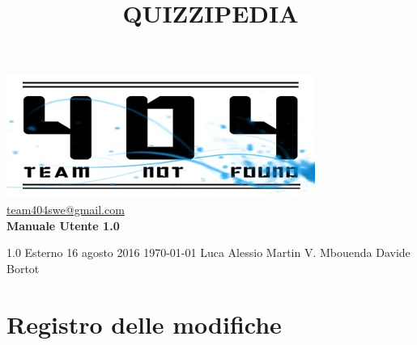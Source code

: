 \documentclass[a4paper,11pt]{article}
\title{\textbf{{\fontsize{8mm}{5mm}\selectfont QUIZZIPEDIA}}}
\date{}
\author{}
\begin{document}
	\maketitle
	\thispagestyle{empty}
	\begin{center}	
	\includegraphics{../team_not_found.jpg}\\
	\fontsize{5mm}{3mm}\url{team404swe@gmail.com}\\
	
	\vspace{50mm}
	\textbf{Manuale Utente 1.0}
	\end{center}
			{1.0} 							%
			{Esterno} 						%
			{16 agosto 2016} 				%
			{\today} 						%
			{Luca Alessio}		%
			{Martin V. Mbouenda} 			%
			{Davide Bortot} 				%
	\newpage
	\thispagestyle{empty}
	\null  

	\newpage
	\newpage
	\fancyfoot[R]{\thepage}
	
	\hspace{30 mm}
	\section*{Registro delle modifiche}
	
	\beginregistro
	
\end{document}
